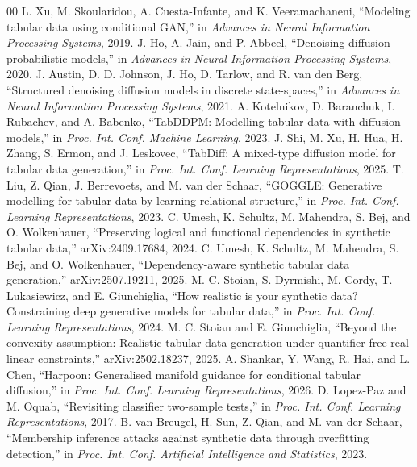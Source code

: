 \documentclass[conference]{IEEEtran}
\begin{document}
\begin{thebibliography}{00}
 L. Xu, M. Skoularidou, A. Cuesta-Infante, and K. Veeramachaneni, ``Modeling tabular data using conditional GAN,'' in \textit{Advances in Neural Information Processing Systems}, 2019.
 J. Ho, A. Jain, and P. Abbeel, ``Denoising diffusion probabilistic models,'' in \textit{Advances in Neural Information Processing Systems}, 2020.
 J. Austin, D. D. Johnson, J. Ho, D. Tarlow, and R. van den Berg, ``Structured denoising diffusion models in discrete state-spaces,'' in \textit{Advances in Neural Information Processing Systems}, 2021.
 A. Kotelnikov, D. Baranchuk, I. Rubachev, and A. Babenko, ``TabDDPM: Modelling tabular data with diffusion models,'' in \textit{Proc. Int. Conf. Machine Learning}, 2023.
 J. Shi, M. Xu, H. Hua, H. Zhang, S. Ermon, and J. Leskovec, ``TabDiff: A mixed-type diffusion model for tabular data generation,'' in \textit{Proc. Int. Conf. Learning Representations}, 2025.
 T. Liu, Z. Qian, J. Berrevoets, and M. van der Schaar, ``GOGGLE: Generative modelling for tabular data by learning relational structure,'' in \textit{Proc. Int. Conf. Learning Representations}, 2023.
 C. Umesh, K. Schultz, M. Mahendra, S. Bej, and O. Wolkenhauer, ``Preserving logical and functional dependencies in synthetic tabular data,'' arXiv:2409.17684, 2024.
 C. Umesh, K. Schultz, M. Mahendra, S. Bej, and O. Wolkenhauer, ``Dependency-aware synthetic tabular data generation,'' arXiv:2507.19211, 2025.
 M. C. Stoian, S. Dyrmishi, M. Cordy, T. Lukasiewicz, and E. Giunchiglia, ``How realistic is your synthetic data? Constraining deep generative models for tabular data,'' in \textit{Proc. Int. Conf. Learning Representations}, 2024.
 M. C. Stoian and E. Giunchiglia, ``Beyond the convexity assumption: Realistic tabular data generation under quantifier-free real linear constraints,'' arXiv:2502.18237, 2025.
 A. Shankar, Y. Wang, R. Hai, and L. Chen, ``Harpoon: Generalised manifold guidance for conditional tabular diffusion,'' in \textit{Proc. Int. Conf. Learning Representations}, 2026.
 D. Lopez-Paz and M. Oquab, ``Revisiting classifier two-sample tests,'' in \textit{Proc. Int. Conf. Learning Representations}, 2017.
 B. van Breugel, H. Sun, Z. Qian, and M. van der Schaar, ``Membership inference attacks against synthetic data through overfitting detection,'' in \textit{Proc. Int. Conf. Artificial Intelligence and Statistics}, 2023.

\end{thebibliography}
\end{document}
